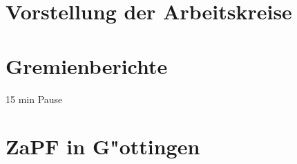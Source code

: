 \documentclass[compress, aspectratio=169]{beamer}
\begin{document}
	\section{Vorstellung der Arbeitskreise}
	
	
	\section{Gremienberichte}
	\begin{frame}{\insertsection}
		15 min Pause
	\end{frame}
	
	\section{ZaPF in G"ottingen}
	\begin{frame}{\insertsection}
	\end{frame}
	
	
\end{document}
